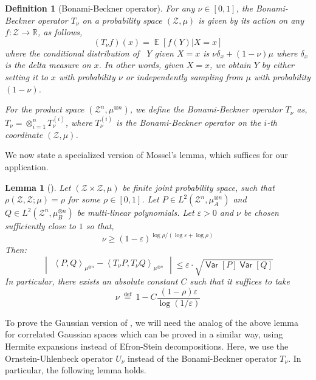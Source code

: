 \documentclass[11pt]{article}
\newcommand{\inangle}[1]{\left \langle #1 \right \rangle}
\newcommand{\inabs}[1]{\begin{vmatrix} #1 \end{vmatrix}}
\newcommand{\defeq}{\stackrel{\mathrm{def}}{=}}
\DeclareMathOperator*{\Ex}{\mathbb{E}}
\DeclareMathOperator*{\Var}{\mathsf{Var}}
\newcommand{\eps}{\varepsilon}
\newcommand{\bbR}{{\mathbb R}}
\newcommand{\calZ}{\mathcal{Z}}
\newtheorem{defn}[theorem]{Definition}
\newtheorem{lem}[theorem]{Lemma}
\begin{document}
\begin{defn}[Bonami-Beckner operator]
	For any $\nu \in [0,1]$, the Bonami-Beckner operator $T_{\nu}$ on a probability space $(\calZ, \mu)$ is given by its action on any $f : \calZ \to \bbR$, as follows,
	$$(T_\nu f)(x) = \Ex[f(Y) | X = x]$$
	where the conditional distribution of \ $Y$ given $X = x$ is $\nu \delta_x + (1-\nu) \mu$ where $\delta_x$ is the delta measure on $x$. In other words, given $X = x$, we obtain $Y$ by either setting it to $x$ with probability $\nu$ or independently sampling from $\mu$ with probability $(1-\nu)$.
	
	For the product space $(\calZ^n, \mu^{\otimes n})$, we define the Bonami-Beckner operator $T_{\nu}$ as, $T_{\nu} = \otimes_{i=1}^n T_{\nu}^{(i)}$, where $T_{\nu}^{(i)}$ is the Bonami-Beckner operator on the $i$-th coordinate $(\calZ, \mu)$.
\end{defn}

\noindent We now state a specialized version of Mossel's lemma, which suffices for our application.

\begin{lem}[\cite{mossel2010gaussianbounds}] \label{lem:mossel_smoothing}
	Let $(\calZ \times \calZ, \mu)$ be finite joint probability space, such that $\rho(\calZ, \calZ; \mu) = \rho$ for some $\rho \in [0,1]$. Let $P \in L^2(\calZ^n, \mu_A^{\otimes n})$ and $Q \in L^2(\calZ^n, \mu_B^{\otimes n})$ be multi-linear polynomials. Let $\eps > 0$ and $\nu$ be chosen sufficiently close to $1$ so that,
	\[\nu \ge (1-\eps)^{\log \rho/(\log \eps + \log \rho)}\]
	Then:
	\[\inabs{\inangle{P, Q}_{\mu^{\otimes n}} - \inangle{T_{\nu}P, T_{\nu}Q}_{\mu^{\otimes n}}} \le \eps \cdot \sqrt{\Var[P] \Var[Q]}\]
	In particular, there exists an absolute constant $C$ such that it suffices to take
	$$\nu ~\defeq~ 1 - C \frac{(1-\rho)\eps}{\log (1/\eps)}$$
\end{lem}

To prove the Gaussian version of , we will need the analog of the above lemma for correlated Gaussian spaces which can be proved in a similar way, using Hermite expansions instead of Efron-Stein decompositions. Here, we use the Ornstein-Uhlenbeck operator $U_\nu$ instead of the Bonami-Beckner operator $T_\nu$. In particular, the following lemma holds.
\end{document}

